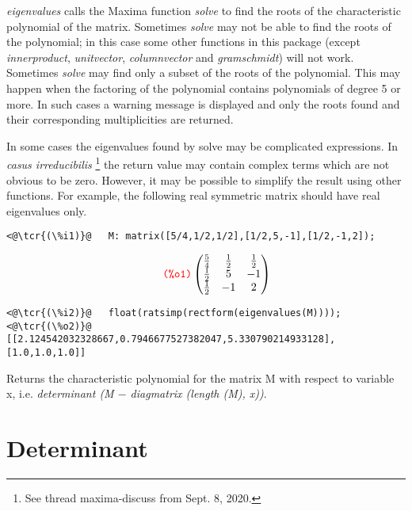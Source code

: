 \documentclass[../Maxima_Workbook.tex]{subfiles}
\begin{document}
\lz \emph{eigenvalues} calls the Maxima function \emph{solve} to find the roots of the characteristic polynomial of the matrix. Sometimes \emph{solve} may not be able to find the roots of the polynomial; in this case some other functions in this package (except \emph{innerproduct}, \emph{unitvector}, \emph{columnvector} and \emph{gramschmidt}) will not work. Sometimes \emph{solve} may find only a subset of the roots of the polynomial. This may happen when the factoring of the polynomial contains polynomials of degree 5 or more. In such cases a warning message is displayed and only the roots found and their corresponding multiplicities are returned.

\lz In some cases the eigenvalues found by solve may be complicated expressions. In \emph{casus irreducibilis} \footnote{See thread maxima-discuss from Sept. 8, 2020.} the return value may contain complex terms which are not obvious to be zero. However, it may be possible to simplify the result using other functions. For example, the following real symmetric matrix should have real eigenvalues only.

\lz \begin{small}
\color{blue}
\begin{lstlisting}
<@\tcr{(\%i1)}@   M: matrix([5/4,1/2,1/2],[1/2,5,-1],[1/2,-1,2]);
\end{lstlisting}
\vspace{-4mm} \[\tag*{\tcr{\ttfamily (\%o1)}} \begin{pmatrix}\frac{5}{4} & \frac{1}{2} & \frac{1}{2}\\
\frac{1}{2} & 5 & -1\\
\frac{1}{2} & -1 & 2\end{pmatrix} \]
\vspace{-5mm} \begin{lstlisting}
<@\tcr{(\%i2)}@   float(ratsimp(rectform(eigenvalues(M))));
<@\tcr{(\%o2)}@   [[2.124542032328667,0.7946677527382047,5.330790214933128],[1.0,1.0,1.0]]
\end{lstlisting}
\color{black}
\end{small}

\lzz {} \hfill \tcr{[function]}

\lz Returns the characteristic polynomial for the matrix M with respect to variable x, i.e. \emph{determinant (M $ - $ diagmatrix (length (M), x))}.

\section{Determinant}
\end{document}
